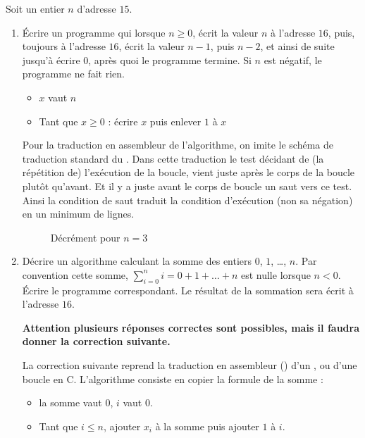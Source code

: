 Soit un entier $n$ d'adresse $15$.
\begin{enumerate}
\item Écrire un programme qui lorsque $n \geq 0$, écrit la valeur $n$
  à l'adresse $16$, puis, toujours à l'adresse $16$, écrit la valeur
  $n - 1$, puis $n - 2$, et ainsi de suite jusqu'à écrire $0$, après
  quoi le programme termine. Si $n$ est négatif, le programme ne fait
  rien.
  \begin{correction}
    \begin{itemize}
    \item $x$ vaut $n$
    \item Tant que $x \geq 0$ : écrire $x$ puis enlever $1$ à $x$
    \end{itemize}

    Pour la traduction en assembleur de l'algorithme, on imite le
    schéma de traduction standard du  . Dans
    cette traduction le test décidant de (la répétition de)
    l'exécution de la boucle, vient juste après le corps de la boucle
    plutôt qu'avant. Et il y a juste avant le corps de boucle un saut
    vers ce test. Ainsi la condition de saut traduit la condition
    d'exécution (non sa négation) en un minimum de lignes.

    \begin{figure}[tbp]
      \centering
      
      \caption{Décrément pour $n = 3$}
      \label{fig:decr}
    \end{figure}
  \end{correction}
\item Décrire un algorithme calculant la somme des entiers $0$, $1$,
  \ldots, $n$. Par convention cette somme, $\sum^n_{i = 0} i
  = 0 + 1 + \ldots + n$ est nulle lorsque $n < 0$. Écrire le programme
  correspondant. Le résultat de la sommation sera écrit à l'adresse
  $16$.
\begin{correction}
\textbf{Attention plusieurs réponses correctes sont possibles, mais
il faudra donner la correction suivante.}

La correction suivante reprend la traduction en assembleur () d'un , ou d'une boucle  en C. L'algorithme consiste en copier la formule de
la somme :
\begin{itemize}
\item la somme vaut $0$,  $i$ vaut $0$.
\item Tant que $i \leq n$, ajouter $x_i$ à la somme puis ajouter $1$ à
  $i$.
\end{itemize}


\end{correction}
\end{enumerate}
